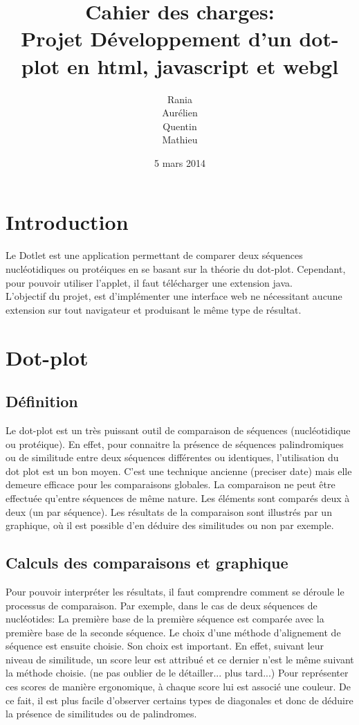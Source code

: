 \documentclass{report}
\title{Cahier des charges: \\Projet Développement d'un dot-plot en html, javascript et webgl }
\author{Rania \bsc{Assab} \\ Aurélien \bsc{Luciani}\\ Quentin \bsc{Riché-Piotaix}\\ Mathieu \bsc{Shaeffer}}
\date{5 mars 2014}
\begin{document}
\maketitle

\tableofcontents
{}

\chapter*{Introduction}

Le Dotlet est une application permettant de comparer deux séquences nucléotidiques ou protéiques en se basant sur la théorie du dot-plot. Cependant, pour pouvoir utiliser l'applet, il faut télécharger une extension java.\\
L'objectif du projet, est d'implémenter une interface web ne nécessitant aucune extension sur tout navigateur et produisant le même type de résultat.


\chapter{Dot-plot}

\section{Définition}

Le dot-plot est un très puissant outil de comparaison de séquences (nucléotidique ou protéique). En effet, pour connaitre la présence de séquences palindromiques ou de similitude entre deux séquences différentes ou identiques, l'utilisation du dot plot est un bon moyen. C'est une technique ancienne (preciser date) mais elle demeure efficace pour les comparaisons globales.
La comparaison ne peut être effectuée qu'entre séquences de même nature. 
Les éléments sont comparés deux à deux (un par séquence). Les résultats de la comparaison sont illustrés par un graphique, où il est possible d'en déduire des similitudes ou non par exemple. 

\section{Calculs des comparaisons et graphique}

Pour pouvoir interpréter les résultats, il faut comprendre comment se déroule le processus de comparaison. Par exemple, dans le cas de deux séquences de nucléotides:  La première base de la première séquence est comparée avec la première base de la seconde séquence. 
Le choix d'une méthode d'alignement de séquence est ensuite choisie. Son choix est important. En effet, suivant leur niveau de similitude, un score leur est attribué et ce dernier n'est le même suivant la méthode choisie. (ne pas oublier de le détailler... plus tard...)
Pour représenter ces scores de manière ergonomique, à chaque score lui est associé une couleur. De ce fait, il est plus facile d'observer certains types de diagonales et donc de déduire la présence de similitudes ou de palindromes.
\end{document}
